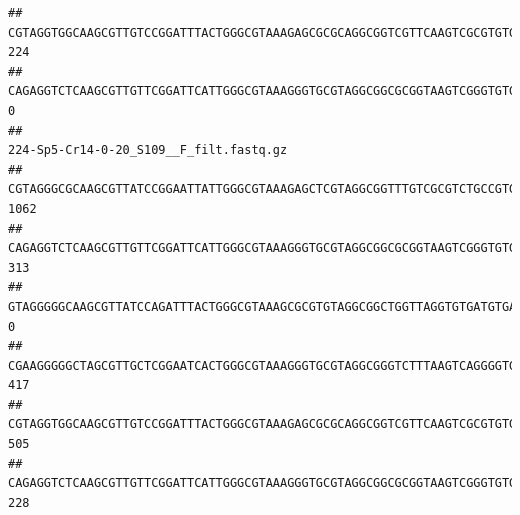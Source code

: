 \documentclass[]{article}
\begin{document}
\begin{verbatim}
## CGTAGGTGGCAAGCGTTGTCCGGATTTACTGGGCGTAAAGAGCGCGCAGGCGGTCGTTCAAGTCGCGTGTGAAAGCCCCCGGCTCAACTGGGGAGGGTCACGCGATACTGATCGACTCGAAGGCAGGAGAGGGTAGTGGAATTCCCGGTGTAGTGGTGAAATGCGTAGATATCGGGAGGAACACCAGTGGCGAAGGCGACTACCTGGCCTGTTCTTGACGCTGAGGCGCGAAAGCTAGGGGAGCAAACG                                     224
## CAGAGGTCTCAAGCGTTGTTCGGATTCATTGGGCGTAAAGGGTGCGTAGGCGGCGCGGTAAGTCGGGTGTGAAATCTCGGGGCTTAACTCCGAAACTGCATTCGATACTGCCGTGCTTGAGGACTGGAGAGGAGACTGGAATTTACGGTGTAGCGGTGAAATGCGTAGATATCGTAAGGAAGACCAGTGGCGAAGGCGGGTCTCTGGACAGTTCCTGACGCTGAGGCACGAAGGCCAGGGGAGCAAACG                                       0
##                                                                                                                                                                                                                                                           224-Sp5-Cr14-0-20_S109__F_filt.fastq.gz
## CGTAGGGCGCAAGCGTTATCCGGAATTATTGGGCGTAAAGAGCTCGTAGGCGGTTTGTCGCGTCTGCCGTGAAAGTCCGGGGCTCAACTCCGGATCTGCGGTGGGTACGGGCAGACTAGAGTGATGTAGGGGAGACTGGAATTCCTGGTGTAGCGGTGAAATGCGCAGATATCAGGAGGAACACCGATGGCGAAGGCAGGTCTCTGGGCATTAACTGACGCTGAGGAGCGAAAGCATGGGGAGCGAACA                                    1062
## CAGAGGTCTCAAGCGTTGTTCGGATTCATTGGGCGTAAAGGGTGCGTAGGCGGCGCGGTAAGTCGGGTGTGAAATCTCGGAGCTTAACTCCGAAACTGCATTCGATACTGCCGTGCTTGAGGACTGGAGAGGAGACTGGAATTTACGGTGTAGCGGTGAAATGCGTAGATATCGTAAGGAAGACCAGTGGCGAAGGCGGGTCTCTGGACAGTTCCTGACGCTGAGGCACGAAGGCCAGGGGAGCAAACG                                     313
## GTAGGGGGCAAGCGTTATCCAGATTTACTGGGCGTAAAGCGCGTGTAGGCGGCTGGTTAGGTGTGATGTGAAATCTTCCGGCTCAACCGGAAAACTGCATTGCAAACCGGCCTGGCTAGAGTGCAGGAGAGGGAAGCGGAATTCCAGGTGTAGCGGTGAAATGCGTAGATATCTGGAGGAACACCAGTGGCGAAGGCGGCTTCCTGGCCTGCAACTGACGCTGAGACGCGAAAGCGTGGGGAGCGAAC                                        0
## CGAAGGGGGCTAGCGTTGCTCGGAATCACTGGGCGTAAAGGGTGCGTAGGCGGGTCTTTAAGTCAGGGGTGAAATCCTGGAGCTCAACTCCAGAACTGCCTTTGATACTGAAGATCTTGAGTTCGGGAGAGGTGAGTGGAACTGCGAGTGTAGAGGTGAAATTCGTAGATATTCGCAAGAACACCAGTGGCGAAGGCGGCTCACTGGCCCGATACTGACGCTGAGGCACGAAAGCGTGGGGAGCAAACA                                     417
## CGTAGGTGGCAAGCGTTGTCCGGATTTACTGGGCGTAAAGAGCGCGCAGGCGGTCGTTCAAGTCGCGTGTGAAAGCCCCCGGCTCAACTGGGGAGGGTCACGCGATACTGATCGACTCGAAGGCAGGAGAGGGTAGTGGAATTCCCGGTGTAGTGGTGAAATGCGTAGATATCGGGAGGAACACCAGTGGCGAAGGCGACTACCTGGCCTGTTCTTGACGCTGAGGCGCGAAAGCTAGGGGAGCAAACG                                     505
## CAGAGGTCTCAAGCGTTGTTCGGATTCATTGGGCGTAAAGGGTGCGTAGGCGGCGCGGTAAGTCGGGTGTGAAATCTCGGGGCTTAACTCCGAAACTGCATTCGATACTGCCGTGCTTGAGGACTGGAGAGGAGACTGGAATTTACGGTGTAGCGGTGAAATGCGTAGATATCGTAAGGAAGACCAGTGGCGAAGGCGGGTCTCTGGACAGTTCCTGACGCTGAGGCACGAAGGCCAGGGGAGCAAACG                                     228

\end{verbatim}
\end{document}

